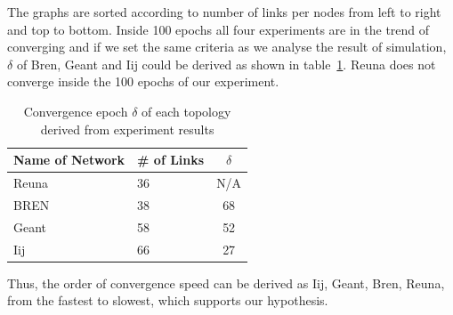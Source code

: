 The graphs are sorted according to number of links per nodes from left to right and top to bottom. Inside 100 epochs all four experiments are in the trend of converging and if we set the same criteria as we analyse the result of simulation, $\delta$ of Bren, Geant and Iij could be derived as shown in table~\ref{table:exp}. Reuna does not converge inside the 100 epochs of our experiment.
\begin{table}
\centering
\caption{Convergence epoch $\delta$ of each topology derived from experiment results}
\begin{tabular}{llc}
	\hline
	Name of Network &  \# of Links & $\delta$ \\
    	\hline
    	Reuna & 36 & N/A\\
    	BREN & 38 & 68\\
    	Geant & 58 & 52\\
    	Iij & 66 & 27\\
    	\hline
\end{tabular}
\label{table:exp}
\end{table}

Thus, the order of convergence speed can be derived as Iij, Geant, Bren, Reuna, from the fastest to slowest, which supports our hypothesis.
